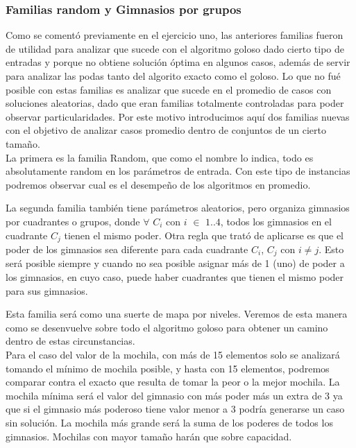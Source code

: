 \subsubsection*{Familias random y Gimnasios por grupos}

Como se comentó previamente en el ejercicio uno, las anteriores familias fueron de utilidad para analizar que sucede con el algoritmo goloso dado cierto tipo de entradas y porque no obtiene solución óptima en algunos casos, además de servir para analizar las podas tanto del algorito exacto como el goloso. Lo que no fué posible con estas familias es analizar que sucede en el promedio de casos con soluciones aleatorias, dado que eran familias totalmente controladas para poder observar particularidades. Por este motivo introducimos aquí dos familias nuevas con el objetivo de analizar casos promedio dentro de conjuntos de un cierto tamaño.\\

La primera es la familia Random, que como el nombre lo indica, todo es absolutamente random en los parámetros de entrada. Con este tipo de instancias podremos observar cual es el desempeño de los algoritmos en promedio.

La segunda familia también tiene parámetros aleatorios, pero organiza gimnasios por cuadrantes o grupos, donde $\forall$ $C_i$ con $i$ $\in$ ${1..4}$, todos los gimnasios en el cuadrante $C_j$ tienen el mismo poder. Otra regla que trató de aplicarse es que el poder de los gimnasios sea diferente para cada cuadrante $C_i$, $C_j$ con $i \neq j$. Esto será posible siempre y cuando no sea posible asignar m\'as de 1 (uno) de poder a los gimnasios, en cuyo caso, puede haber cuadrantes que tienen el mismo poder para sus gimnasios.

Esta familia será como una suerte de mapa por niveles. Veremos de esta manera como se desenvuelve sobre todo el algoritmo goloso para obtener un camino dentro de estas circunstancias.\\

Para el caso del valor de la mochila, con más de 15 elementos solo se analizará tomando el mínimo de mochila posible, y hasta con 15 elementos, podremos comparar contra el exacto que resulta de tomar la peor o la mejor mochila.
La mochila mínima será el valor del gimnasio con más poder más un extra de 3 ya que si el gimnasio más poderoso tiene valor menor a 3 podría generarse un caso sin solución. La mochila más grande será la suma de los poderes de todos los gimnasios. Mochilas con mayor tamaño harán que sobre capacidad.\\

